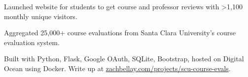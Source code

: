 \documentclass[]{deedy-resume-openfont}
\begin{document}
\hfill{}

\begin{tightemize}
\item Launched website for students to get course and professor reviews with >1,100 monthly unique visitors.
\item Aggregated 25,000+ course evaluations from Santa Clara University's course evaluation system.
\item Built with Python, Flask, Google OAuth, SQLite, Bootstrap, hosted on Digital Ocean using Docker. Write up at \href{https://zachbellay.com/projects/scu-course-evals}{zachbellay.com/projects/scu-course-evals}.
\end{tightemize}





\end{document}
